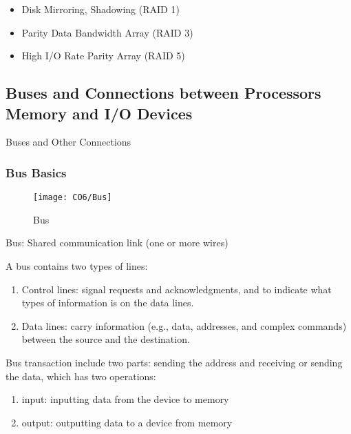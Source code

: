 \begin{itemize}
    \item Disk Mirroring, Shadowing (RAID 1)
    \item Parity Data Bandwidth Array (RAID 3)
    \item High I/O Rate Parity Array (RAID 5)
\end{itemize}

\subsection{Buses and Connections between Processors Memory and I/O Devices}
Buses and Other Connections
\subsubsection{Bus Basics}
\begin{figure}[!htb]
    \centering
    \texttt{[image: CO6/Bus]}
    \caption{Bus}
\end{figure}
Bus: Shared communication link (one or more wires)

A bus contains two types of lines:
\begin{enumerate}\small
    \item Control lines: signal requests and acknowledgments, and to indicate what types of information is on the data lines.
    \item Data lines: carry information (e.g., data, addresses, and complex commands) between the source and the destination.
\end{enumerate}

Bus transaction include two parts: sending the address and receiving or sending the data, which has two operations:
\begin{enumerate}\small
    \item input: inputting data from the device to memory
    \item output: outputting data to a device from memory
\end{enumerate}

